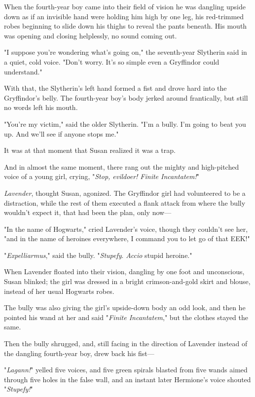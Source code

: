 When the fourth-year boy came into their field of vision he was dangling upside
down as if an invisible hand were holding him high by one leg, his red-trimmed
robes beginning to slide down his thighs to reveal the pants beneath. His mouth
was opening and closing helplessly, no sound coming out.

"I suppose you're wondering what's going on," the seventh-year Slytherin said
in a quiet, cold voice. "Don't worry. It's so simple even a Gryffindor could
understand."

With that, the Slytherin's left hand formed a fist and drove hard into the
Gryffindor's belly. The fourth-year boy's body jerked around frantically, but
still no words left his mouth.

"You're my victim," said the older Slytherin. "I'm a bully. I'm going to beat
you up. And we'll see if anyone stops me."

It was at that moment that Susan realized it was a trap.

And in almost the same moment, there rang out the mighty and high-pitched voice
of a young girl, crying, "\emph{Stop, evildoer! Finite Incantatem!}"

\emph{Lavender}, thought Susan, agonized. The Gryffindor girl had volunteered
to be a distraction, while the rest of them executed a flank attack from where
the bully wouldn't expect it, that had been the plan, only now---

"In the name of Hogwarts," cried Lavender's voice, though they couldn't see
her, "and in the name of heroines everywhere, I command you to let go of that
EEK!"

"\emph{Expelliarmus}," said the bully. "\emph{Stupefy}. \emph{Accio} stupid
heroine."

When Lavender floated into their vision, dangling by one foot and unconscious,
Susan blinked; the girl was dressed in a bright crimson-and-gold skirt and
blouse, instead of her usual Hogwarts robes.

The bully was also giving the girl's upside-down body an odd look, and then he
pointed his wand at her and said "\emph{Finite Incantatem}," but the clothes
stayed the same.

Then the bully shrugged, and, still facing in the direction of Lavender instead
of the dangling fourth-year boy, drew back his fist---

"\emph{Lagann!}" yelled five voices, and five green spirals blasted from five
wands aimed through five holes in the false wall, and an instant later
Hermione's voice shouted "\emph{Stupefy!}"

